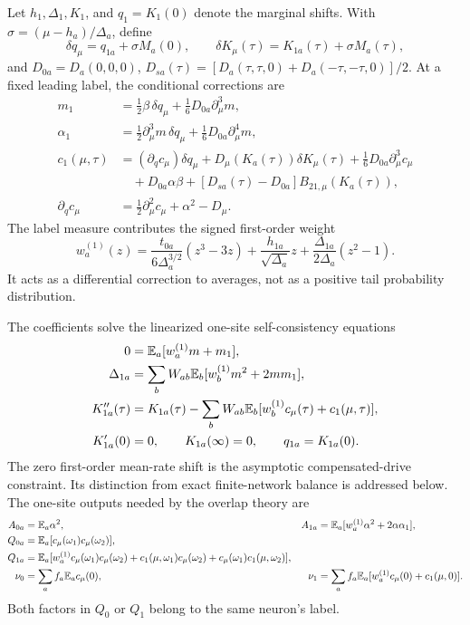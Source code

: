 Let $h_1,\Delta_1,K_1$, and $q_1=K_1(0)$ denote the marginal shifts. With
$\sigma=(\mu-h_a)/\Delta_a$, define
\[
 \delta q_\mu=q_{1a}+\sigma M_a(0),\qquad
 \delta K_\mu(\tau)=K_{1a}(\tau)+\sigma M_a(\tau),
\]
and $D_{0a}=D_a(0,0,0)$,
$D_{sa}(\tau)=[D_a(\tau,\tau,0)+D_a(-\tau,-\tau,0)]/2$.
At a fixed leading label, the conditional corrections are
\begin{align*}
 m_1&=\tfrac12\beta\,\delta q_\mu
       +\tfrac16D_{0a}\partial_\mu^3m,\\
 \alpha_1&=\tfrac12\partial_\mu^3m\,\delta q_\mu
       +\tfrac16D_{0a}\partial_\mu^4m,\\
 c_1(\mu,\tau)&=(\partial_qc_\mu)\delta q_\mu
       +D_\mu(K_a(\tau))\delta K_\mu(\tau)
       +\tfrac16D_{0a}\partial_\mu^3c_\mu\\
 &\quad+D_{0a}\alpha\beta+
      [D_{sa}(\tau)-D_{0a}]B_{21,\mu}(K_a(\tau)),\\
 \partial_qc_\mu&=\tfrac12\partial_\mu^2c_\mu+\alpha^2-D_\mu.
\end{align*}
The label measure contributes the signed first-order weight
\[
 w_a^{(1)}(z)=\frac{t_{0a}}{6\Delta_a^{3/2}}(z^3-3z)
       +\frac{h_{1a}}{\sqrt{\Delta_a}}z
       +\frac{\Delta_{1a}}{2\Delta_a}(z^2-1).
\]
It acts as a differential correction to averages, not as a positive tail
probability distribution.

The coefficients solve the linearized one-site self-consistency equations
\begin{align*}
 0&=\mathbb E_a[w_a^{(1)}m+m_1],\\
 \Delta_{1a}&=\sum_bW_{ab}\mathbb E_b[w_b^{(1)}m^2+2mm_1],\\
 K_{1a}''(\tau)&=K_{1a}(\tau)
       -\sum_bW_{ab}\mathbb E_b[w_b^{(1)}c_\mu(\tau)+c_1(\mu,\tau)],\\
 K_{1a}'(0)&=0,\qquad K_{1a}(\infty)=0,\qquad q_{1a}=K_{1a}(0).
\end{align*}
The zero first-order mean-rate shift is the asymptotic compensated-drive
constraint. Its distinction from exact finite-network balance is addressed
below. The one-site outputs needed by the overlap theory are
\begin{align*}
 A_{0a}&=\mathbb E_a\alpha^2,&
 A_{1a}&=\mathbb E_a[w_a^{(1)}\alpha^2+2\alpha\alpha_1],\\
 Q_{0a}&=\mathbb E_a[c_\mu(\omega_1)c_\mu(\omega_2)],\\
 Q_{1a}&=\mathbb E_a[w_a^{(1)}c_\mu(\omega_1)c_\mu(\omega_2)
        +c_1(\mu,\omega_1)c_\mu(\omega_2)
        +c_\mu(\omega_1)c_1(\mu,\omega_2)],\\
 \nu_0&=\sum_af_a\mathbb E_ac_\mu(0),&
 \nu_1&=\sum_af_a\mathbb E_a[w_a^{(1)}c_\mu(0)+c_1(\mu,0)].
\end{align*}
Both factors in $Q_0$ or $Q_1$ belong to the same neuron's label.

